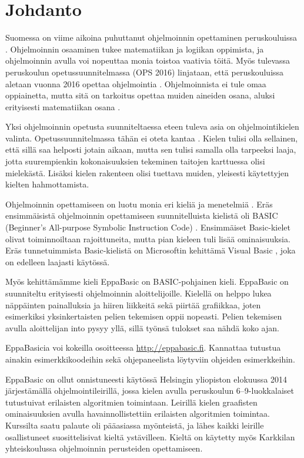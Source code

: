 
\section{Johdanto}
Suomessa on viime aikoina
puhuttanut ohjelmoinnin
opettaminen peruskouluissa
\cite{hs_kiuru}\cite{hs_eka}.
Ohjelmoinnin osaaminen
tukee matematiikan ja logiikan
oppimista, ja ohjelmoinnin
avulla voi nopeuttaa monia
toistoa vaativia töitä.
Myös tulevassa peruskoulun
opetussuunnitelmassa (OPS 2016)
linjataan, että peruskouluissa aletaan
vuonna 2016 opettaa ohjelmointia
\cite{OPS_2016}.
Ohjelmoinnista ei tule omaa oppiainetta,
mutta sitä on tarkoitus opettaa muiden
aineiden osana, aluksi erityisesti
matematiikan osana \cite{OPS_2016}\cite{hs_eka}.

Yksi ohjelmoinnin opetusta suunniteltaessa eteen tuleva
asia on ohjelmointikielen valinta.
Opetussuunnitelmassa tähän ei
oteta kantaa \cite{hs_eka}.
Kielen tulisi olla sellainen,
että sillä saa helposti jotain aikaan,
mutta sen tulisi samalla olla tarpeeksi laaja,
jotta suurempienkin kokonaisuuksien tekeminen
taitojen karttuessa olisi mielekästä.
Lisäksi kielen rakenteen olisi tuettava muiden,
yleisesti käytettyjen kielten hahmottamista.

Ohjelmoinnin opettamiseen
on luotu monia eri kieliä ja menetelmiä
\cite{language_history}.
Eräs ensimmäisistä ohjelmoinnin opettamiseen
suunnitelluista kielistä oli BASIC
(Beginner's All-purpose Symbolic Instruction Code)
\cite{basic}.
Ensimmäiset Basic-kielet olivat toiminnoiltaan rajoittuneita,
mutta pian kieleen tuli lisää ominaisuuksia.
Eräs tunnetuimmista Basic-kielistä on
Microsoftin kehittämä Visual Basic
\cite{vb.net},
joka on edelleen laajasti käytössä.

Myös kehittämämme kieli EppaBasic
on BASIC-pohjainen kieli.
EppaBasic on suunniteltu
erityisesti ohjelmoinnin aloittelijoille.
Kielellä on helppo lukea
näppäinten painalluksia
ja hiiren liikkeitä
sekä piirtää grafiikkaa,
joten esimerkiksi yksinkertaisten
pelien tekemisen oppii nopeasti.
Pelien tekemisen avulla aloittelijan into pysyy yllä,
sillä työnsä tulokset saa nähdä koko ajan.

EppaBasicia voi kokeilla osoitteessa
\url{http://eppabasic.fi}.
Kannattaa tutustua ainakin esimerkkikoodeihin
sekä ohjepaneelista löytyviin
ohjeiden esimerkkeihin.

EppaBasic on ollut onnistuneesti käytössä
Helsingin yliopiston elokuussa 2014
järjestämällä ohjelmointileirillä,
jossa kielen avulla peruskoulun
6--9-luokkalaiset
tutustuivat erilaisten algoritmien toimintaan.
Leirillä kielen graafisten ominaisuuksien
avulla havainnollistettiin erilaisten
algoritmien toimintaa.
Kurssilta saatu palaute oli pääasiassa myönteistä,
ja lähes kaikki leirille osallistuneet
suosittelisivat kieltä ystävilleen.
Kieltä on käytetty myös Karkkilan yhteiskoulussa
ohjelmoinnin perusteiden opettamiseen.

